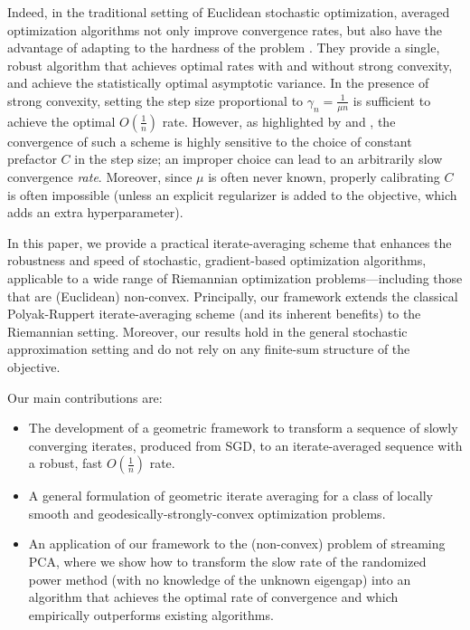 Indeed, in the traditional setting of Euclidean stochastic optimization, averaged optimization algorithms not only improve convergence rates, but also have the advantage of adapting to the hardness of the problem \citep{moulines2011non}.  They provide a single, robust algorithm that achieves optimal rates with and without strong convexity, and achieve the statistically optimal asymptotic variance. In the presence of strong convexity, setting the step size proportional to $\gamma_n\!=\!\frac{1}{\mu n}$ is sufficient to achieve the optimal $O(\frac{1}{n})$ rate. However, as highlighted by \citet{NemJudLan08} and \citet{moulines2011non}, the convergence of such a scheme is highly sensitive to the choice of constant prefactor $C$ in the step size;
an improper choice can lead to an arbitrarily slow convergence \emph{rate}.
Moreover, since $\mu$ is often never known, properly calibrating $C$ is often impossible (unless an explicit regularizer is added to the objective, which adds an extra hyperparameter).

In this paper, we provide a practical iterate-averaging scheme that enhances the robustness and speed of stochastic, gradient-based optimization algorithms, applicable to a  wide range of Riemannian optimization problems---including those that are (Euclidean) non-convex. Principally, our framework extends the classical Polyak-Ruppert iterate-averaging scheme (and its inherent benefits) to the Riemannian setting.
Moreover, our results hold in the general stochastic approximation setting and do not rely on any finite-sum structure of the objective.

Our main contributions are:
\begin{itemize}
\vspace*{-6pt}
  \item The development of a geometric framework to transform a sequence of slowly converging iterates, produced from SGD, to an iterate-averaged sequence
  with a robust, fast $O(\frac{1}{n})$ rate.
  \vspace*{-6pt}
  \item A general formulation of geometric iterate averaging for a class of locally smooth and geodesically-strongly-convex optimization problems.
  \vspace*{-6pt}
  \item An application of our framework to the (non-convex) problem of streaming PCA, where we show how to transform the slow rate of the randomized power method (with no knowledge of the unknown eigengap) into an algorithm that achieves the optimal rate of convergence and which empirically outperforms existing algorithms.
  \vspace*{-6pt}
\end{itemize}
\vspace*{-5.1pt}
